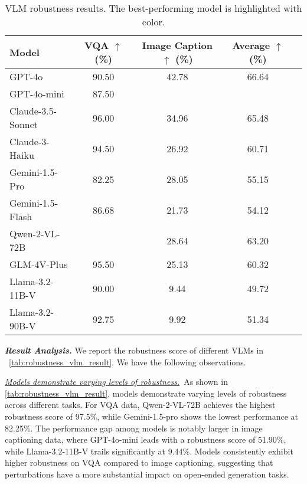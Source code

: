 \begin{table}[t]
\centering
\small
\caption{VLM robustness results. The best-performing model is highlighted with {} color.}
\renewcommand\arraystretch{1.3}
\begin{tabular}{lcccc} %
\toprule[1pt]
\textbf{Model} & \textbf{VQA $\uparrow$ (\%)} & \textbf{Image Caption $\uparrow$ (\%)} &\textbf{Average $\uparrow$ (\%)}\\
\midrule
GPT-4o & 90.50 & 42.78  & 66.64 \\ 
GPT-4o-mini & 87.50 & \color{OliveGreen}{\textbf{\underline{51.90}}} & \color{OliveGreen}{\textbf{\underline{69.70}}}\\ 
Claude-3.5-Sonnet & 96.00 & 34.96 & 65.48\\ 
Claude-3-Haiku & 94.50 & 26.92 & 60.71\\ 
Gemini-1.5-Pro & 82.25 & 28.05 & 55.15\\ 
Gemini-1.5-Flash & 86.68 & 21.73 & 54.12\\ 
Qwen-2-VL-72B &\color{OliveGreen}{\textbf{\underline{97.50}}}  & 28.64 & 63.20\\ 
GLM-4V-Plus & 95.50 & 25.13 & 60.32\\  
Llama-3.2-11B-V & 90.00 & 9.44 & 49.72\\ 
Llama-3.2-90B-V & 92.75 & 9.92 &51.34 \\
\bottomrule[1pt]
\end{tabular}
\label{tab:robustness_vlm_result}
\vspace{-10pt}
\end{table}


\textit{\textbf{Result Analysis.}} We report the robustness score of different VLMs in ~\autoref{tab:robustness_vlm_result}. We have the following observations.

\textit{\ul{Models demonstrate varying levels of robustness.}}~As shown in \autoref{tab:robustness_vlm_result}, models demonstrate varying levels of robustness across different tasks. For VQA data, Qwen-2-VL-72B achieves the highest robustness score of 97.5\%, while Gemini-1.5-pro shows the lowest performance at 82.25\%. The performance gap among models is notably larger in image captioning data, where GPT-4o-mini leads with a robustness score of 51.90\%, while Llama-3.2-11B-V trails significantly at 9.44\%. Models consistently exhibit higher robustness on VQA compared to image captioning, suggesting that perturbations have a more substantial impact on open-ended generation tasks.


